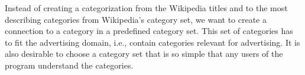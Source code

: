 

Instead of creating a categorization from the Wikipedia titles and to the most describing categories from Wikipedia's category set, we want to create a connection to a category in a predefined category set. This set of categories has to fit the advertising domain, i.e., contain categories relevant for advertising. It is also desirable to choose a category set that is so simple that any users of the program understand the categories. 





